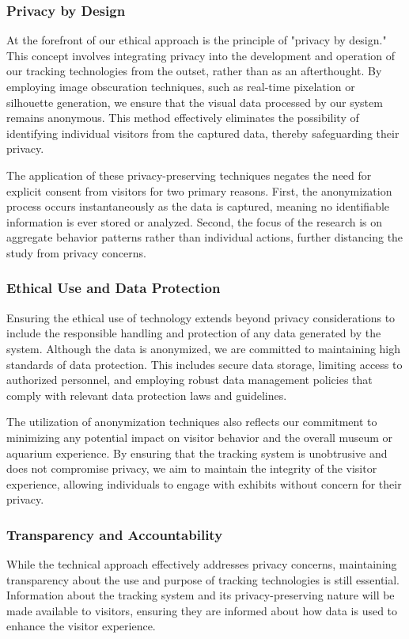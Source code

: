 \subsubsection{Privacy by Design}
At the forefront of our ethical approach is the principle of "privacy by design." This concept involves integrating privacy into the development and operation of our tracking technologies from the outset, rather than as an afterthought. By employing image obscuration techniques, such as real-time pixelation or silhouette generation, we ensure that the visual data processed by our system remains anonymous. This method effectively eliminates the possibility of identifying individual visitors from the captured data, thereby safeguarding their privacy.

The application of these privacy-preserving techniques negates the need for explicit consent from visitors for two primary reasons. First, the anonymization process occurs instantaneously as the data is captured, meaning no identifiable information is ever stored or analyzed. Second, the focus of the research is on aggregate behavior patterns rather than individual actions, further distancing the study from privacy concerns.

\subsubsection{Ethical Use and Data Protection}
Ensuring the ethical use of technology extends beyond privacy considerations to include the responsible handling and protection of any data generated by the system. Although the data is anonymized, we are committed to maintaining high standards of data protection. This includes secure data storage, limiting access to authorized personnel, and employing robust data management policies that comply with relevant data protection laws and guidelines. 

The utilization of anonymization techniques also reflects our commitment to minimizing any potential impact on visitor behavior and the overall museum or aquarium experience. By ensuring that the tracking system is unobtrusive and does not compromise privacy, we aim to maintain the integrity of the visitor experience, allowing individuals to engage with exhibits without concern for their privacy.

\subsubsection{Transparency and Accountability}
While the technical approach effectively addresses privacy concerns, maintaining transparency about the use and purpose of tracking technologies is still essential. Information about the tracking system and its privacy-preserving nature will be made available to visitors, ensuring they are informed about how data is used to enhance the visitor experience.

